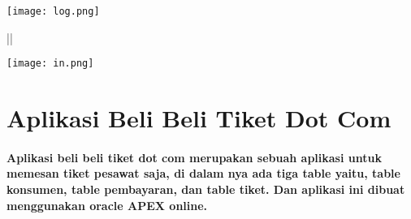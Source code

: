 \documentclass{article}
\begin{document}
\begin{center}
    \texttt{[image: log.png]}
\end{center} ||

\begin{center}
    \texttt{[image: in.png]}
\end{center}

\section{Aplikasi Beli Beli Tiket Dot Com}
\hspace \paragraph{Aplikasi beli beli tiket dot com merupakan sebuah aplikasi untuk memesan tiket pesawat saja, di dalam nya ada tiga table yaitu, table konsumen, table pembayaran, dan table tiket. Dan aplikasi ini dibuat menggunakan oracle APEX online.}  
\end{document}
